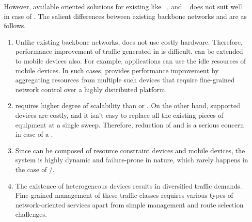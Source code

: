 However, available  oriented solutions for existing  like ~\cite{casado2012fabric,nayak2009resonance,kreutz2015software},  and ~\cite{yu2011scalable,yu2014palantir,berde2014onos} does not suit well in case of . The salient differences between existing backbone networks and  are as follows.
\begin{enumerate}
 \item Unlike existing backbone networks,  does not use costly hardware. Therefore, performance improvement of traffic generated in  is difficult.  can be extended to mobile devices also. For example,  applications can use the idle resources of mobile devices. In such cases,  provides performance improvement by aggregating resources from multiple such devices that require fine-grained network control over a highly distributed platform.
 \item {} requires higher degree of scalability than  or . On the other hand,  supported devices are costly, and it isn't easy to replace all the existing pieces of equipment at a single sweep. Therefore, reduction of  and  is a serious concern in case of a .
 \item Since  can be composed of resource constraint devices and mobile devices, the system is highly dynamic and failure-prone in nature, which rarely happens in the case of /.
 \item The existence of heterogeneous devices results in diversified traffic demands. Fine-grained management of these traffic classes requires various types of network-oriented services apart from simple  management and route selection challenges.
\end{enumerate}
\

